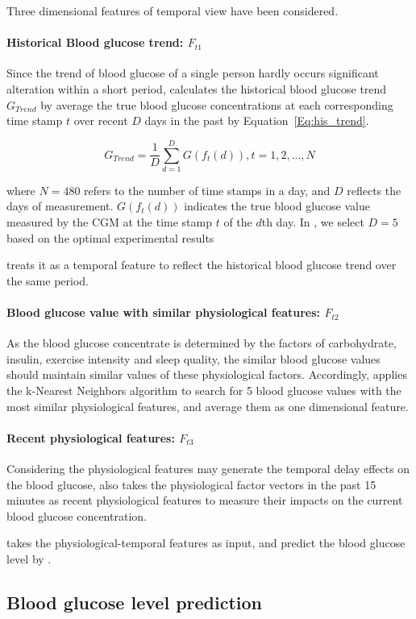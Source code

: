 Three dimensional features of temporal view have been considered.

\paragraph{Historical Blood glucose trend: $F_{t1}$} 
Since the trend of blood glucose of a single person hardly occurs significant alteration 
within a short period, \sysname calculates the historical blood glucose trend $G_{Trend}$ by average the true blood glucose
concentrations at each corresponding time stamp $t$ over recent $D$ days in the past by Equation~\ref{Eq:his_trend}. 

\begin{equation}\label{Eq:his_trend}
  G_{Trend}=\frac{1}{D}\sum_{d=1}^{D}G(f_t(d)),  t=1,2,...,N
\end{equation}

where $N=480$ refers to the number of time stamps in a day, and $D$ reflects the days of measurement. $G(f_t(d))$ indicates the true blood glucose value measured by the CGM
at the time stamp $t$ of the $d$th day. In \sysname, we select $D=5$ based on the optimal experimental results

\sysname treats it as a temporal feature to reflect the historical blood glucose trend
over the same period.

\paragraph{Blood glucose value with similar physiological features: $F_{t2}$}
As the blood glucose concentrate is determined by the factors of carbohydrate, insulin, exercise intensity and sleep quality, the similar blood 
glucose values should maintain similar values of these physiological factors. Accordingly, \sysname applies the k-Nearest Neighbors algorithm \cite{bib:KNN} 
to search for 5 blood glucose values with the most similar physiological features, and average them as one dimensional feature.

\paragraph{Recent physiological features: $F_{t3}$}
Considering the physiological features may generate the temporal delay effects on the blood glucose, \sysname also takes the physiological factor vectors
in the past 15 minutes as recent physiological features to measure their impacts on the current blood glucose concentration. 

\sysname takes the physiological-temporal features as input, and predict the blood glucose level by \modelname. 


\subsection{Blood glucose level prediction}


